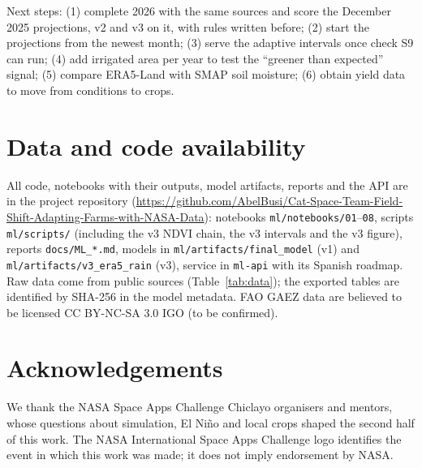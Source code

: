 \documentclass[11pt,a4paper]{article}
\begin{document}
\noindent Next steps: (1) complete 2026 with the same sources and score the December 2025 projections, v2 and v3 on it,
with rules written before; (2) start the projections from the newest month; (3) serve the adaptive intervals once
check S9 can run; (4) add irrigated area per year to test the ``greener than expected'' signal; (5) compare ERA5-Land with
SMAP soil moisture; (6) obtain yield data to move from conditions to crops.

\section*{Data and code availability}
All code, notebooks with their outputs, model artifacts, reports and the API are in the project repository
(\url{https://github.com/AbelBusi/Cat-Space-Team-Field-Shift-Adapting-Farms-with-NASA-Data}): notebooks
\texttt{ml/notebooks/01}--\texttt{08}, scripts \texttt{ml/scripts/} (including the v3 NDVI chain, the v3 intervals and the
v3 figure), reports \texttt{docs/ML\_*.md}, models in \texttt{ml/artifacts/final\_model} (v1) and
\texttt{ml/artifacts/v3\_era5\_rain} (v3), service in \texttt{ml-api} with its Spanish roadmap. Raw data come from public
sources (Table~\ref{tab:data}); the exported tables are identified by SHA-256 in the model metadata. FAO GAEZ data are
believed to be licensed CC BY-NC-SA 3.0 IGO (to be confirmed).

\section*{Acknowledgements}
We thank the NASA Space Apps Challenge Chiclayo organisers and mentors, whose questions about simulation, El Ni\~no and
local crops shaped the second half of this work. The NASA International Space Apps Challenge logo identifies the event in
which this work was made; it does not imply endorsement by NASA.
\end{document}
